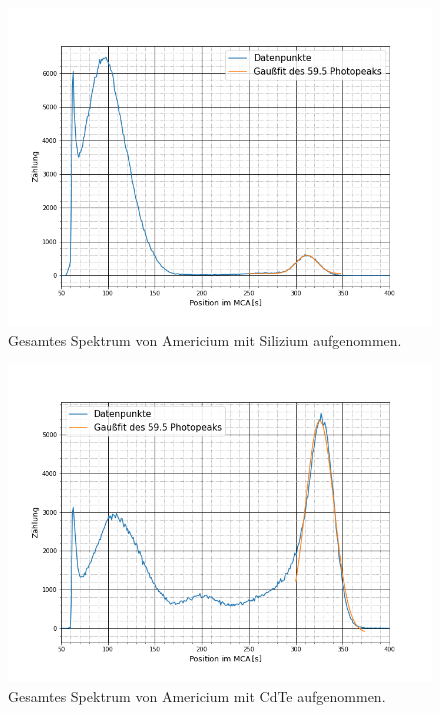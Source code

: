 \begin{figure}[ht]
	\includegraphics[scale=0.5]{Bild/ASg}
	\centering
	\caption{Gesamtes Spektrum von Americium mit Silizium aufgenommen.}
\end{figure}
\begin{figure}[ht]
	\includegraphics[scale=0.5]{Bild/ACg}
	\centering
	\caption{Gesamtes Spektrum von Americium mit CdTe aufgenommen.}
\end{figure}
